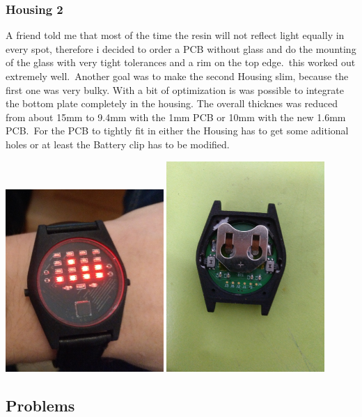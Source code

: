 \subsubsection{Housing 2}
A friend told me that most of the time the resin will not reflect light equally in every spot, therefore i decided to order a PCB without glass and do the mounting of the glass with very tight tolerances and a rim on the top edge.\
this worked out extremely well.\
Another goal was to make the second Housing slim, because the first one was very bulky. With a bit of optimization is was possible to integrate the bottom plate completely in the housing. The overall thicknes was reduced from about 15mm to 9.4mm with the 1mm PCB or 10mm with the new 1.6mm PCB.\
For the PCB to tightly fit in either the Housing has to get some aditional holes or at least the Battery clip has to be modified.\
\begin{center}
\includegraphics[width=0.45\textwidth]{../Pictures/Housing2.jpg} \includegraphics[width=0.45\textwidth]{../Pictures/Housing3b.jpg}
\end{center}

\subsection{Problems}

